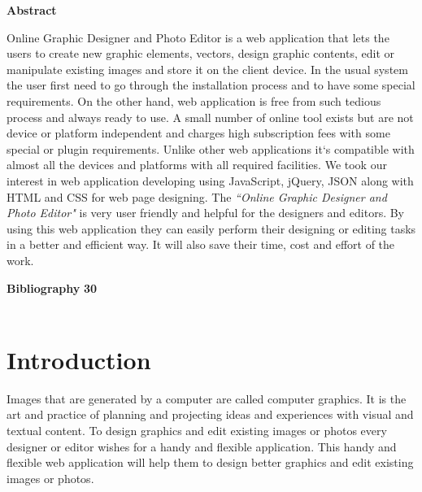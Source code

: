 \documentclass[12pt,a4 paper]{report}
\begin{document}
\newpage
 \vspace*{2cm}
\begin{center}
\begin{LARGE}
\textbf{Abstract}
\end{LARGE}
\end{center}
Online Graphic Designer and Photo Editor is a web application that lets the users to create new graphic elements, vectors, design graphic contents, edit or manipulate existing images and store it on the client device. In the usual system the user first need to go through the installation process and to have some special requirements. On the other hand, web application is free from such tedious process and always ready to use. A small number of online tool exists but are not device or platform independent and charges high subscription fees with some special or plugin requirements. Unlike other web 
applications it`s compatible with almost all the devices and platforms with all required facilities. We took our interest in web application developing using JavaScript, jQuery, JSON along with HTML and CSS for web page designing. The \textit{``Online Graphic Designer and Photo Editor"} is very user friendly and helpful for the designers and editors. By using this web application they can easily perform their designing or editing tasks in a better and efficient way. It will also save their time, cost and effort of the work.

\newpage
\tableofcontents
\vspace*{1cm}
\textbf{Bibliography} \hspace{9.8cm} \textbf{30} \\ \\ \hspace*{.5cm}
\listoffigures
\newpage


\setcounter{page}{1}
\pagestyle{plain}

\chapter{Introduction}
Images that are generated by a computer are called computer graphics. It is the art and practice of planning and projecting ideas and experiences with visual and textual content. To design graphics and edit existing images or photos every designer or editor wishes for a handy and flexible application. This handy and flexible web application will help them to design better graphics and edit existing images or photos. \\
\end{document}
